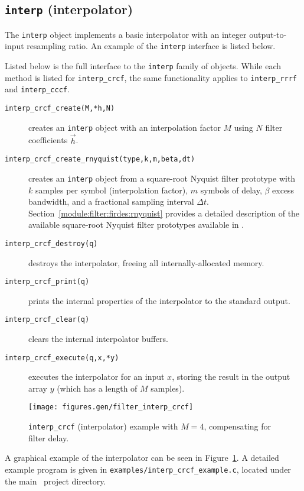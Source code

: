 \subsection{{\tt interp} (interpolator)}
\label{module:filter:interp}
The {\tt interp} object implements a basic interpolator with an integer
output-to-input resampling ratio.
An example of the {\tt interp} interface is listed below.
%

%
Listed below is the full interface to the {\tt interp} family of
objects.
While each method is listed for {\tt interp\_crcf}, the same
functionality applies to {\tt interp\_rrrf} and {\tt interp\_cccf}.
%
\begin{description}
\item[{\tt interp\_crcf\_create(M,*h,N)}]
    creates an {\tt interp} object with an interpolation factor $M$
    using $N$ filter coefficients $\vec{h}$.
\item[{\tt interp\_crcf\_create\_rnyquist(type,k,m,beta,dt)}]
    creates an {\tt interp} object
    from a square-root Nyquist filter prototype with
    $k$ samples per symbol (interpolation factor),
    $m$ symbols of delay,
    $\beta$ excess bandwidth,
    and a fractional sampling interval $\Delta t$.
    Section~\ref{module:filter:firdes:rnyquist}
    provides a detailed description of the available square-root Nyquist
    filter prototypes available in \liquid.
\item[{\tt interp\_crcf\_destroy(q)}]
    destroys the interpolator, freeing all internally-allocated memory.
\item[{\tt interp\_crcf\_print(q)}]
    prints the internal properties of the interpolator to the standard
    output.
\item[{\tt interp\_crcf\_clear(q)}]
    clears the internal interpolator buffers.
\item[{\tt interp\_crcf\_execute(q,x,*y)}]
    executes the interpolator for an input $x$, storing the result in
    the output array $y$ (which has a length of $M$ samples).
\end{description}
%
\begin{figure}
\centering
  \texttt{[image: figures.gen/filter\_interp\_crcf]}
\caption{{\tt interp\_crcf} (interpolator) example with $M=4$,
         compensating for filter delay.}
\label{fig:module:filter:interp_crcf}
\end{figure}
%
A graphical example of the interpolator can be seen in
Figure~\ref{fig:module:filter:interp_crcf}.
A detailed example program is given in
{\tt examples/interp\_crcf\_example.c},
located under the main \liquid\ project directory.


